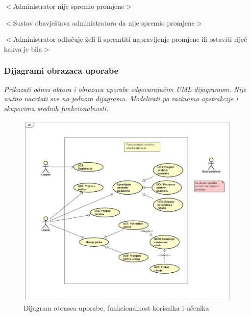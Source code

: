 \begin{packed_item}
\begin{packed_item}
\begin{packed_enum}
							\end{packed_enum}
							\item[8.a] $<$Administrator nije spremio promjene$>$
							\item[] \begin{packed_enum}
								
								\item $<$Sustav obavještava administratora da nije spremio promjene$>$
								\item $<$Administrator odlučuje želi li spremtiti napravljenje promjene ili ostaviti riječ kakva je bila$>$
								
							\end{packed_enum}

						\end{packed_item}			
					\end{packed_item}
				
					
				\subsubsection{Dijagrami obrazaca uporabe}
					
					\textit{Prikazati odnos aktora i obrazaca uporabe odgovarajućim UML dijagramom. Nije nužno nacrtati sve na jednom dijagramu. Modelirati po razinama apstrakcije i skupovima srodnih funkcionalnosti.}
					\begin{figure}[H]
						\includegraphics[width=\textwidth]{dijagrami/ucdiag1.png} %
						\caption{Dijagram obrasca uporabe, funkcionalnost korisnika i učenika}
						\label{fig:ucdiag1} %
					\end{figure}

